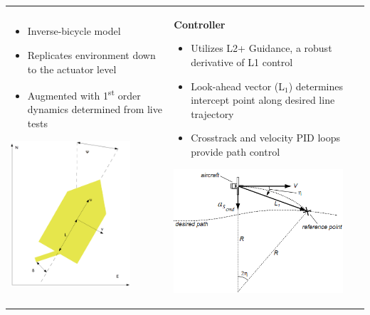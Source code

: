 \documentclass[landscape,archE]{baposter}
\begin{document}
\begin{poster}
{\begin{tabular}{p{} p{} p{}}
   \begin{itemize}
     \item Inverse-bicycle model
     \item Replicates environment down to the actuator level
     \item Augmented with 1\textsuperscript{st} order dynamics determined from live tests
   \end{itemize}
   \vspace{0.5em}
   \begin{center}
      \includegraphics[width=12em]{images/inverse_bicycle.png}
   \end{center}
   &
   \begin{center}
      \textbf{Controller}
   \end{center}

   \begin{itemize}
     \item Utilizes L2+ Guidance, a robust derivative of L1 control
     \item Look-ahead vector (L$_\text{1}$) determines intercept point along desired line trajectory
     \item Crosstrack and velocity PID loops provide path control
   \end{itemize}

   \vspace{0em} %
   \begin{center}
      \includegraphics[width=17em]{images/L1-control.png}
   \end{center}
   \end{tabular}

}
\end{poster}
\end{document}
